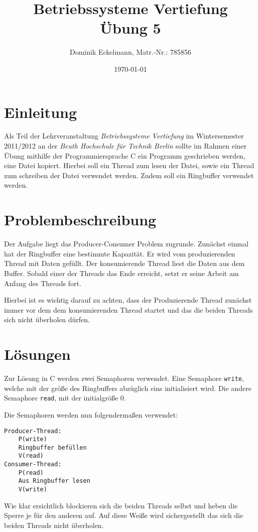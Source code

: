\documentclass[a4paper]{article}
\title{Betriebssysteme Vertiefung \\ Übung 5}
\author{Dominik Eckelmann, Matr.-Nr.: 785856}
\date{\today}
\begin{document}
\maketitle

\tableofcontents

\section{Einleitung}
Als Teil der Lehrveranstaltung \textit{Betriebssysteme Vertiefung} im Wintersemester 2011/2012 an der \textit{Beuth Hochschule für Technik Berlin} sollte im Rahmen einer Übung mithilfe der Programmiersprache C ein Programm geschrieben werden, eine Datei kopiert. Hierbei soll ein Thread zum lesen der Datei, sowie ein Thread zum schreiben der Datei verwendet werden. Zudem soll ein Ringbuffer verwendet werden.

\section{Problembeschreibung}
Der Aufgabe liegt das Producer-Consumer Problem zugrunde.
Zunächst einmal hat der Ringbuffer eine bestimmte Kapazität.
Er wird vom produzierenden Thread mit Daten gefüllt.
Der konsumierende Thread liest die Daten aus dem Buffer.
Sobald einer der Threads das Ende erreicht, setzt er seine Arbeit
am Anfang des Threads fort.

Hierbei ist es wichtig darauf zu achten, dass der Produzierende Thread zunächst
immer vor dem dem konsumierenden Thread startet und das die beiden Threads sich nicht
überholen dürfen.

\section{Lösungen}

Zur Lösung in C werden zwei Semaphoren verwendet. 
Eine Semaphore \texttt{write}, welche mit der größe des Ringbuffers abzüglich eins initialisiert wird. Die andere Semaphore \texttt{read}, mit der initialgröße 0.

Die Semaphoren werden nun folgendermaßen verwendet:
\begin{verbatim}
Producer-Thread:
    P(write)
    Ringbuffer befüllen
    V(read)
Consumer-Thread:
    P(read)
    Aus Ringbuffer lesen
    V(write)
\end{verbatim}

Wie klar ersichtlich blockieren sich die beiden Threads selbst und heben die Sperre je für den
anderen auf. Auf diese Weiße wird sichergestellt das sich die beiden Threads nicht überholen.
\end{document}
